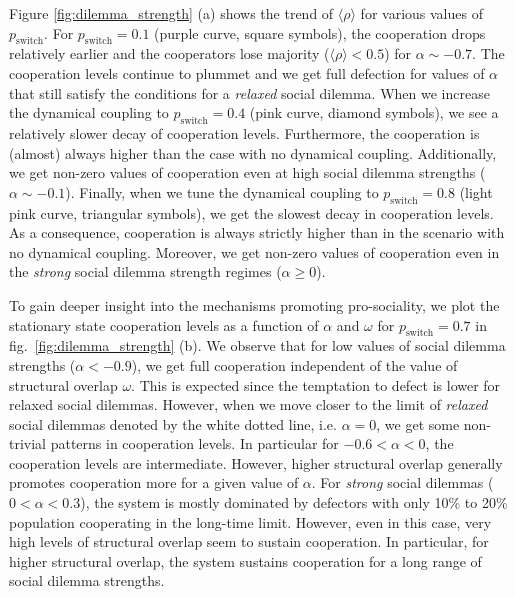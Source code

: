 \documentclass[a4paper,pre,reqno,superscriptaddress,twocolumn, floatfix]{revtex4}
\begin{document}
Figure \eqref{fig:dilemma_strength} (a) shows the trend of $\langle \rho \rangle$ for various values of $p_{\text{switch}}$. For $p_{\text{switch}}=0.1$ (purple curve, square symbols), the cooperation drops relatively earlier and the cooperators lose majority ($\langle \rho \rangle < 0.5$) for $\alpha \sim -0.7$. The cooperation levels continue to plummet and we get full defection for values of $\alpha$ that still satisfy the conditions for a \textit{relaxed} social dilemma. When we increase the dynamical coupling to $p_{\text{switch}} = 0.4$ (pink curve, diamond symbols), we see a relatively slower decay of cooperation levels. Furthermore, the cooperation is (almost) always higher than the case with no dynamical coupling. Additionally, we get non-zero values of cooperation even at high social dilemma strengths ($\alpha \sim -0.1$). Finally, when we tune the dynamical coupling to $p_{\text{switch}} = 0.8$ (light pink curve, triangular symbols), we get the slowest decay in cooperation levels. As a consequence, cooperation is always strictly higher than in the scenario with no dynamical coupling. Moreover, we get non-zero values of cooperation even in the \textit{strong} social dilemma strength regimes ($\alpha \geq 0$). 



To gain deeper insight into the mechanisms promoting pro-sociality, we plot the stationary state cooperation levels as a function of $\alpha$ and $\omega$ for $p_{\text{switch}}=0.7$ in fig.~\eqref{fig:dilemma_strength} (b). We observe that for low values of social dilemma strengths ($\alpha < -0.9$), we get full cooperation independent of the value of structural overlap $\omega$. This is expected since the temptation to defect is lower for relaxed social dilemmas. However, when we move closer to the limit of \textit{relaxed} social dilemmas denoted by the white dotted line, i.e. $\alpha = 0$, we get some non-trivial patterns in cooperation levels. In particular for $-0.6 < \alpha < 0$, the cooperation levels are intermediate. However, higher structural overlap generally promotes cooperation more for a given value of $\alpha$. For \textit{strong} social dilemmas ($0 < \alpha < 0.3$), the system is mostly dominated by defectors with only 10\% to 20\% population cooperating in the long-time limit. However, even in this case, very high levels of structural overlap seem to sustain cooperation. In particular, for higher structural overlap, the system sustains cooperation for a long range of social dilemma strengths.
\end{document}
